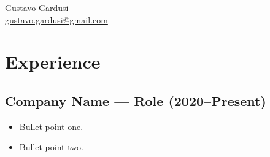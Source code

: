 \documentclass[10pt]{article}
\begin{document}
\begin{center}
{\huge Gustavo Gardusi}\\
\href{mailto:gustavo.gardusi@gmail.com}{gustavo.gardusi@gmail.com}
\end{center}
\section*{Experience}
\subsection*{Company Name — Role (2020--Present)}
\begin{itemize}
\item Bullet point one.
\item Bullet point two.
\end{itemize}
\end{document}
